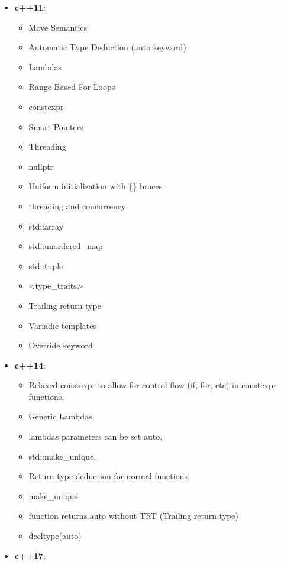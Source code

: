 \documentclass{report}
\begin{document}
\pagebreak 
{}
\begin{itemize}
    \item \textbf{c++11}: 
        \begin{itemize}
            \item Move Semantics
            \item Automatic Type Deduction (auto keyword)
            \item Lambdas
            \item Range-Based For Loops
            \item constexpr
            \item Smart Pointers
            \item Threading
            \item nullptr
            \item Uniform initialization with \{\} braces
            \item threading and concurrency
            \item std::array
            \item std::unordered\_map
            \item std::tuple
            \item <type\_traits>
            \item Trailing return type
            \item Variadic templates
            \item Override keyword
        \end{itemize}
    \item \textbf{c++14}: 
        \begin{itemize}
            \item Relaxed constexpr to allow for control flow (if, for, etc) in constexpr functions. 
            \item Generic Lambdas,
            \item lambdas parameters can be set auto,
            \item std::make\_unique,
            \item Return type deduction for normal functions,
            \item make\_unique
            \item function returns auto without TRT (Trailing return type)
            \item decltype(auto)
        \end{itemize}
    \item \textbf{c++17}: 

\end{itemize}
\end{document}
